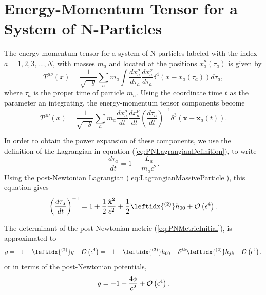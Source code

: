 \section{Energy-Momentum Tensor for a System of N-Particles}
The energy momentum tensor for a system of N-particles labeled with the index $a=1,2,3,...,N$, with masses $m_a$ and located at the positions $x^\mu _a (\tau_a)$ is given by
\begin{equation}
T^{\mu \nu} (x) = \frac{1}{\sqrt{-g}} \sum _a m_a \int \frac{dx^\mu _a}{d\tau _a} \frac{dx^\nu _a}{d\tau _a} \delta ^4 \left( x - x_a (\tau_a) \right) d\tau_a ,
\end{equation}
where $\tau_a$ is the proper time of particle $m_a$.  Using the coordinate time $t$ as the parameter an integrating, the energy-momentum tensor components become
\begin{equation}
T^{\mu \nu} (x) = \frac{1}{\sqrt{-g}} \sum _a m_a  \frac{dx^\mu _a}{d t} \frac{dx^\nu _a}{dt} \left( \frac{d\tau _a}{dt}\right)^{-1}  \delta ^3 \left( \textbf{x} - \textbf{x}_a (t) \right). \label{eq:NParticlesEnergyMomentum01}
\end{equation}

In order to obtain the power expansion of these components, we use the definition of the Lagrangian in equation (\ref{eq:PNLagrangianDefinition}), to write
\begin{equation}
\frac{d\tau _a}{dt} = 1 - \frac{L_a}{m_a c^2 }.
\end{equation}
Using the post-Newtonian Lagrangian (\ref{eq:LagrangianMassiveParticle}), this equation gives
\begin{equation}
\left( \frac{d\tau _a}{dt}\right)^{-1}  = 1 + \frac{1}{2} \frac{\dot{\textbf{x}}^2}{c^2} + \frac{1}{2} \leftidx{^{(2)}}h_{00} + \Ordof \left( \epsilon^4 \right).
\end{equation}

The determinant of the post-Newtonian metric (\ref{eq:PNMetricInitial}), is approximated to 
\begin{equation}
g = -1 + \leftidx{^{(2)}} g +  \Ordof \left( \epsilon^4 \right) = -1 + \leftidx{^{(2)}}h_{00} - \delta^{jk} \leftidx{^{(2)}}h_{jk} +  \Ordof \left( \epsilon^4 \right),
\end{equation}
or in terms of the post-Newtonian potentials,
\begin{equation}
g = -1 + \frac{4\phi}{c^2} +  {\mathcal{O}} \left( \epsilon^4 \right).
\end{equation}

